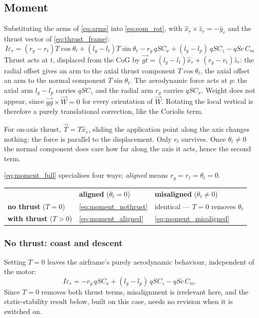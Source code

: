 \subsection{Moment}\label{sec:analysis_moment}
Substituting the arms of \autoref{eq:arms} into \autoref{eq:eom_rot}, with $\hat{x}_r\times
\hat{z}_r=-\hat{y}_r$ and the thrust vector of \autoref{eq:thrust_frame}:
\begin{equation} \label{eq:moment_full}
    I\varepsilon_r = (r_g - r_t)T\cos\theta_t + (l_g - l_t)T\sin\theta_t
                     - r_g\,qSC_x + (l_g - l_p)\,qSC_z - qSc\,C_m
\end{equation}
Thrust acts at $t$, displaced from the CoG by $\vec{gt}=(l_g-l_t)\hat{x}_r+(r_g-r_t)\hat{z}_r$:
the radial offset gives an arm to the axial thrust component $T\cos\theta_t$, the axial offset an
arm to the normal component $T\sin\theta_t$. The aerodynamic force acts at $p$: the axial arm
$l_g-l_p$ carries $qSC_z$ and the radial arm $r_g$ carries $qSC_x$. Weight does not appear, since
$\vec{gg}\times\vec{W}=0$ for every orientation of $\vec{W}$. Rotating the local vertical is
therefore a purely translational correction, like the Coriolis term.

For on-axis thrust, $\vec{T}=T\hat{x}_r$, sliding the application point along the axis changes
nothing: the force is parallel to the displacement. Only $r_t$ survives. Once $\theta_t\neq0$ the
normal component does care how far along the axis it acts, hence the second term.

\autoref{eq:moment_full} specialises four ways; \emph{aligned} means $r_g=r_t=\theta_t=0$.
\begin{center}
\begin{tabular}{l l l}
 & \textbf{aligned} ($\theta_t=0$) & \textbf{misaligned} ($\theta_t\neq0$) \\
\textbf{no thrust} ($T=0$) & \autoref{eq:moment_nothrust} & identical --- $T=0$ removes $\theta_t$ \\
\textbf{with thrust} ($T>0$) & \autoref{eq:moment_aligned} & \autoref{eq:moment_misaligned} \\
\end{tabular}
\end{center}

\subsubsection{No thrust: coast and descent}\label{sec:analysis_nothrust}
Setting $T=0$ leaves the airframe's purely aerodynamic behaviour, independent of the motor:
\begin{equation} \label{eq:moment_nothrust}
    I\varepsilon_r = -r_g\,qSC_x + (l_g - l_p)\,qSC_z - qSc\,C_m.
\end{equation}
Since $T=0$ removes both thrust terms, misalignment is irrelevant here, and the static-stability
result below, built on this case, needs no revision when it is switched on.

